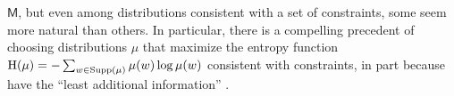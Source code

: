 \documentclass{article}
\newcommand{\sfM}{\mathsf M}
\numberwithin{equation}{section}
\begin{document}
		$\sfM$, but even among distributions consistent with a set of
        constraints, some seem more natural than others.
	In particular, there is a compelling precedent of
choosing distributions $\mu$ that maximize the entropy function
        $\mathrm{H}(\mu) = -\sum_{w \in \text{Supp($\mu$)}} \mu(w) \log \mu(w)$
consistent with constraints,
	in part because have the ``least additional information''
        \parencite{jaynes1957information}. 
\end{document}
